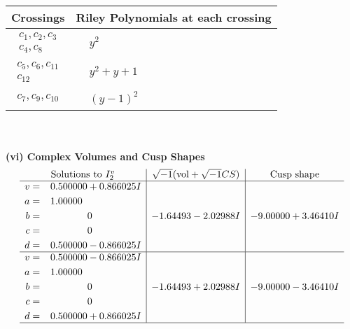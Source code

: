 \documentclass[1p]{elsarticle_modified}
\theoremstyle{definition}
\newcommand{\I}{\sqrt{-1}}
\begin{document}
\begin{tabular}{m{50pt}|m{274pt}}
Crossings & \hspace{64pt}Riley Polynomials at each crossing \\
\hline $$\begin{aligned}c_{1},c_{2},c_{3}\\c_{4},c_{8}\end{aligned}$$&$\begin{aligned}
&y^2
\end{aligned}$\\
\hline $$\begin{aligned}c_{5},c_{6},c_{11}\\c_{12}\end{aligned}$$&$\begin{aligned}
&y^2+y+1
\end{aligned}$\\
\hline $$\begin{aligned}c_{7},c_{9},c_{10}\end{aligned}$$&$\begin{aligned}
&(y-1)^2
\end{aligned}$\\
\hline
\end{tabular}\\~\\
\newpage\flushleft \textbf{(vi) Complex Volumes and Cusp Shapes}
$$\begin{array}{c|c|c}  
\text{Solutions to }I^v_{2}& \I (\text{vol} + \sqrt{-1}CS) & \text{Cusp shape}\\
 \hline 
\begin{aligned}
v &= \phantom{-}0.500000 + 0.866025 I \\
a &= \phantom{-}1.00000\phantom{ +0.000000I} \\
b &= \phantom{-0.000000 } 0 \\
c &= \phantom{-0.000000 } 0 \\
d &= \phantom{-}0.500000 - 0.866025 I\end{aligned}
 & -1.64493 - 2.02988 I & -9.00000 + 3.46410 I \\ \hline\begin{aligned}
v &= \phantom{-}0.500000 - 0.866025 I \\
a &= \phantom{-}1.00000\phantom{ +0.000000I} \\
b &= \phantom{-0.000000 } 0 \\
c &= \phantom{-0.000000 } 0 \\
d &= \phantom{-}0.500000 + 0.866025 I\end{aligned}
 & -1.64493 + 2.02988 I & -9.00000 - 3.46410 I\\
 \hline 
 \end{array}$$\newpage\newpage\renewcommand{\arraystretch}{1}
\end{document}
